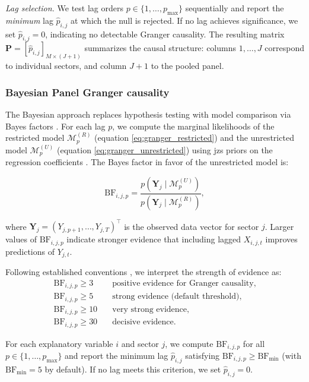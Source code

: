 \documentclass[preprint, 3p,
authoryear]{elsarticle} %
\begin{document}
\emph{Lag selection.} We test lag orders \(p \in \{1,\ldots,p_{\max}\}\)
sequentially and report the \emph{minimum} lag \(\widehat{p}_{i,j}\) at
which the null is rejected. If no lag achieves significance, we set
\(\widehat{p}_{i,j} = 0\), indicating no detectable Granger causality.
The resulting matrix
\(\mathbf{P} = [\widehat{p}_{i,j}]_{M \times (J+1)}\) summarizes the
causal structure: columns \(1,\ldots,J\) correspond to individual
sectors, and column \(J+1\) to the pooled panel.

\subsubsection{Bayesian Panel Granger causality}\label{sec:bpgc}

The Bayesian approach replaces hypothesis testing with model comparison
via Bayes factors \citep{koop2010, koop2013}. For each lag \(p\), we
compute the marginal likelihoods of the restricted model
\(\mathcal{M}^{(R)}_p\) (equation \eqref{eq:granger_restricted}) and the
unrestricted model \(\mathcal{M}^{(U)}_p\) (equation
\eqref{eq:granger_unrestricted}) using \gls{jzs} priors on the
regression coefficients \citep{liang2008, rouder2012}. The Bayes factor
in favor of the unrestricted model is:

\begin{equation}
\text{BF}_{i,j,p} = \frac{p(\mathbf{Y}_j \mid \mathcal{M}^{(U)}_p)}{p(\mathbf{Y}_j \mid \mathcal{M}^{(R)}_p)},
\label{eq:bayes_factor}
\end{equation}

\noindent where \(\mathbf{Y}_j = (Y_{j,p+1},\ldots,Y_{j,T})^\top\) is
the observed data vector for sector \(j\). Larger values of
\(\text{BF}_{i,j,p}\) indicate stronger evidence that including lagged
\(X_{i,j,t}\) improves predictions of \(Y_{j,t}\).

Following established conventions \citep{kass1995, jeffreys1961}, we
interpret the strength of evidence as: \begin{align*}
\text{BF}_{i,j,p} \geq 3 &\quad \text{positive evidence for Granger causality,} \\
\text{BF}_{i,j,p} \geq 5 &\quad \text{strong evidence (default threshold),} \\
\text{BF}_{i,j,p} \geq 10 &\quad \text{very strong evidence,} \\
\text{BF}_{i,j,p} \geq 30 &\quad \text{decisive evidence.}
\end{align*}

\noindent For each explanatory variable \(i\) and sector \(j\), we
compute \(\text{BF}_{i,j,p}\) for all \(p \in \{1,\ldots,p_{\max}\}\)
and report the minimum lag \(\widehat{p}_{i,j}\) satisfying
\(\text{BF}_{i,j,p} \geq \text{BF}_{\min}\) (with
\(\text{BF}_{\min} = 5\) by default). If no lag meets this criterion, we
set \(\widehat{p}_{i,j} = 0\).
\end{document}
